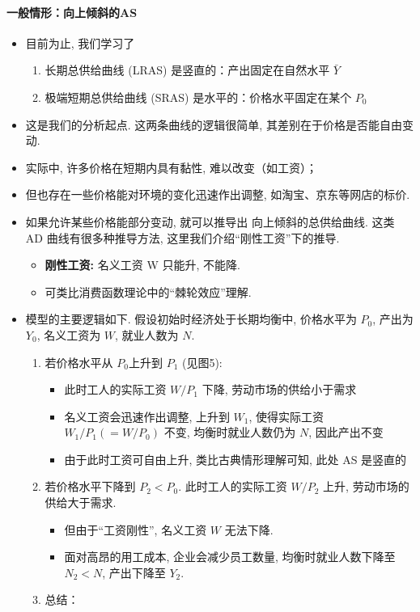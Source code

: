 \documentclass[10pt]{ctexart}
\begin{document}
\paragraph{一般情形：向上倾斜的AS}
\begin{itemize}
\item
  目前为止, 我们学习了
  \begin{enumerate}
    \item 长期总供给曲线 (LRAS) 是竖直的：产出固定在自然水平 $\bar Y$
    \item 极端短期总供给曲线 (SRAS) 是水平的：价格水平固定在某个 $P_0$
  \end{enumerate}
\item
  这是我们的分析起点. 这两条曲线的逻辑很简单, 其差别在于价格是否能自由变动. 
\item
  实际中, 许多价格在短期内具有黏性, 难以改变（如工资）；
\item   
  但也存在一些价格能对环境的变化迅速作出调整, 如淘宝、京东等网店的标价. 
\item
  如果允许某些价格能部分变动, 就可以推导出
  向上倾斜的总供给曲线. 这类 AD 曲线有很多种推导方法, 
  这里我们介绍``刚性工资''下的推导.
  \begin{itemize}
  \item
    \textbf{刚性工资:} 名义工资 W 只能升, 不能降.
  \item
    可类比消费函数理论中的``棘轮效应''理解.
  \end{itemize}
\item
  模型的主要逻辑如下. 假设初始时经济处于长期均衡中, 价格水平为
  \(P_0\), 产出为 $Y_0$, 名义工资为 \(W\), 就业人数为 $N$.   \begin{enumerate}
  \def\labelenumi{\arabic{enumi}.}
  \item
    若价格水平从 $P_0$上升到 \(P_1\) (见图5): 
    \begin{itemize}
    \item 此时工人的实际工资
    \(W/P_1\) 下降, 劳动市场的供给小于需求
    \item
      名义工资会迅速作出调整, 上升到 \(W_1\), 使得实际工资\(W_1/P_1( = W/P_0)\) 不变, 
      均衡时就业人数仍为 \(N\),  因此产出不变
    \item 由于此时工资可自由上升, 类比古典情形理解可知, 此处 AS 是竖直的  
    \end{itemize}
  \item
    若价格水平下降到 \(P_2<P_0\). 此时工人的实际工资
    \(W/P_2\) 上升, 劳动市场的供给大于需求. 

    \begin{itemize}
    \item
      但由于``工资刚性'', 名义工资 $W$ 无法下降. 
    \item  
      面对高昂的用工成本, 企业会减少员工数量, 均衡时就业人数下降至 $N_2 < N$, 产出下降至 $Y_2$.
    \end{itemize}
  \item
    总结：


\end{enumerate}
\end{itemize}
\end{document}
